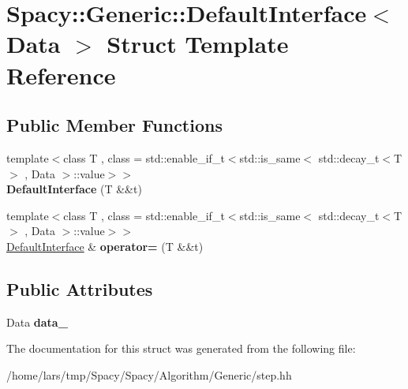 \hypertarget{structSpacy_1_1Generic_1_1DefaultInterface}{}\section{Spacy\+:\+:Generic\+:\+:Default\+Interface$<$ Data $>$ Struct Template Reference}
\label{structSpacy_1_1Generic_1_1DefaultInterface}
\subsection*{Public Member Functions}
\begin{DoxyCompactItemize}
\item 
{\footnotesize template$<$class T , class  = std\+::enable\+\_\+if\+\_\+t$<$std\+::is\+\_\+same$<$ std\+::decay\+\_\+t$<$\+T$>$ , Data $>$\+::value$>$$>$ }\\{\bfseries Default\+Interface} (T \&\&t)\hypertarget{structSpacy_1_1Generic_1_1DefaultInterface_a77f00f53c09087dab3cb751f1580b327}{}\label{structSpacy_1_1Generic_1_1DefaultInterface_a77f00f53c09087dab3cb751f1580b327}

\item 
{\footnotesize template$<$class T , class  = std\+::enable\+\_\+if\+\_\+t$<$std\+::is\+\_\+same$<$ std\+::decay\+\_\+t$<$\+T$>$ , Data $>$\+::value$>$$>$ }\\\hyperlink{structSpacy_1_1Generic_1_1DefaultInterface}{Default\+Interface} \& {\bfseries operator=} (T \&\&t)\hypertarget{structSpacy_1_1Generic_1_1DefaultInterface_ac439759218c6df1f8f7cbf38e4be51a5}{}\label{structSpacy_1_1Generic_1_1DefaultInterface_ac439759218c6df1f8f7cbf38e4be51a5}

\end{DoxyCompactItemize}
\subsection*{Public Attributes}
\begin{DoxyCompactItemize}
\item 
Data {\bfseries data\+\_\+}\hypertarget{structSpacy_1_1Generic_1_1DefaultInterface_afacc26987a814ebe95292ff45c9744bd}{}\label{structSpacy_1_1Generic_1_1DefaultInterface_afacc26987a814ebe95292ff45c9744bd}

\end{DoxyCompactItemize}


The documentation for this struct was generated from the following file\+:\begin{DoxyCompactItemize}
\item 
/home/lars/tmp/\+Spacy/\+Spacy/\+Algorithm/\+Generic/step.\+hh\end{DoxyCompactItemize}

